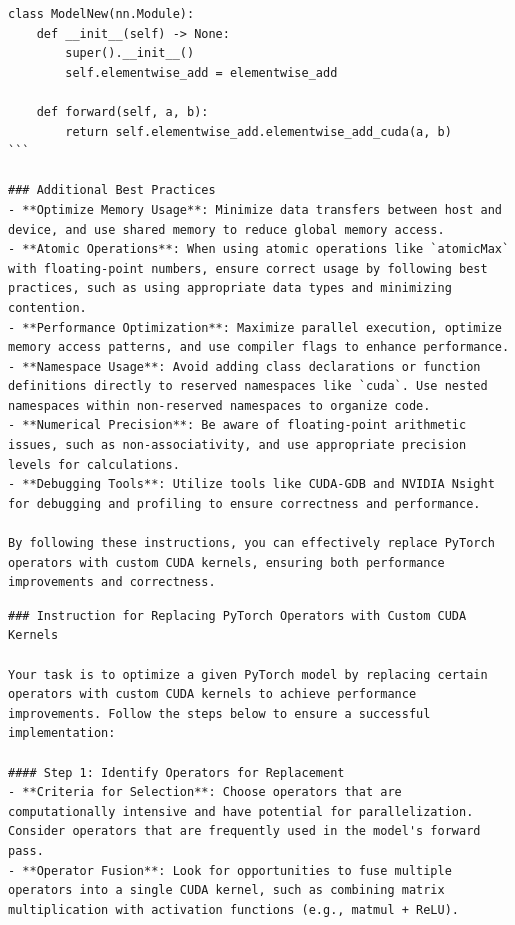 \documentclass{article} %
\begin{document}
\begin{instructbox}
\begin{lstlisting}
class ModelNew(nn.Module):
    def __init__(self) -> None:
        super().__init__()
        self.elementwise_add = elementwise_add

    def forward(self, a, b):
        return self.elementwise_add.elementwise_add_cuda(a, b)
```

### Additional Best Practices
- **Optimize Memory Usage**: Minimize data transfers between host and device, and use shared memory to reduce global memory access.
- **Atomic Operations**: When using atomic operations like `atomicMax` with floating-point numbers, ensure correct usage by following best practices, such as using appropriate data types and minimizing contention.
- **Performance Optimization**: Maximize parallel execution, optimize memory access patterns, and use compiler flags to enhance performance.
- **Namespace Usage**: Avoid adding class declarations or function definitions directly to reserved namespaces like `cuda`. Use nested namespaces within non-reserved namespaces to organize code.
- **Numerical Precision**: Be aware of floating-point arithmetic issues, such as non-associativity, and use appropriate precision levels for calculations.
- **Debugging Tools**: Utilize tools like CUDA-GDB and NVIDIA Nsight for debugging and profiling to ensure correctness and performance.

By following these instructions, you can effectively replace PyTorch operators with custom CUDA kernels, ensuring both performance improvements and correctness.
\end{lstlisting}

\begin{lstlisting}
### Instruction for Replacing PyTorch Operators with Custom CUDA Kernels

Your task is to optimize a given PyTorch model by replacing certain operators with custom CUDA kernels to achieve performance improvements. Follow the steps below to ensure a successful implementation:

#### Step 1: Identify Operators for Replacement
- **Criteria for Selection**: Choose operators that are computationally intensive and have potential for parallelization. Consider operators that are frequently used in the model's forward pass.
- **Operator Fusion**: Look for opportunities to fuse multiple operators into a single CUDA kernel, such as combining matrix multiplication with activation functions (e.g., matmul + ReLU).


\end{lstlisting}
\end{instructbox}
\end{document}
